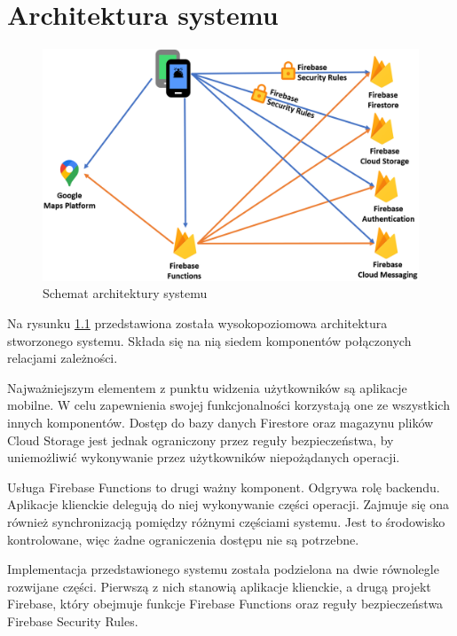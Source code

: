 \chapter{Architektura systemu}

\begin{figure}[ht]
  \centering
  \includegraphics[width=\linewidth]{images/architecture.png}
  \caption{Schemat architektury systemu}
  \label{fig:architecture}
\end{figure}

Na rysunku \ref{fig:architecture} przedstawiona została wysokopoziomowa architektura stworzonego systemu. Składa się na nią siedem komponentów połączonych relacjami zależności.

Najważniejszym elementem z punktu widzenia użytkowników są aplikacje mobilne. W celu zapewnienia swojej funkcjonalności korzystają one ze wszystkich innych komponentów. Dostęp do bazy danych Firestore oraz magazynu plików Cloud Storage jest jednak ograniczony przez reguły bezpieczeństwa, by uniemożliwić wykonywanie przez użytkowników niepożądanych operacji.

Usługa Firebase Functions to drugi ważny komponent. Odgrywa rolę backendu. Aplikacje klienckie delegują do niej wykonywanie części operacji. Zajmuje się ona również synchronizacją pomiędzy różnymi częściami systemu. Jest to środowisko kontrolowane, więc żadne ograniczenia dostępu nie są potrzebne.

Implementacja przedstawionego systemu została podzielona na dwie równolegle rozwijane części. Pierwszą z nich stanowią aplikacje klienckie, a drugą projekt Firebase, który obejmuje funkcje Firebase Functions oraz reguły bezpieczeństwa Firebase Security Rules.

